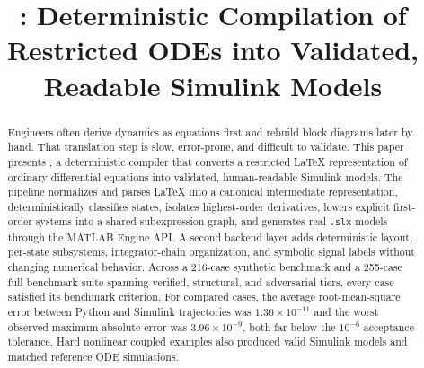 \documentclass[colorlinks,upint,subscriptcorrection,varvw,balance,nofoot]{asmeconf}
\newcommand{\EqnToSim}{\NoCaseChange{Eqn2Sim}}
\begin{document}

\title{\EqnToSim: Deterministic Compilation of Restricted \NoCaseChange{\LaTeX} ODEs into Validated, Readable Simulink Models}


\maketitle



\begin{abstract}
Engineers often derive dynamics as equations first and rebuild block diagrams later by hand. That translation step is slow, error-prone, and difficult to validate. This paper presents \EqnToSim, a deterministic compiler that converts a restricted \LaTeX{} representation of ordinary differential equations into validated, human-readable Simulink models. The pipeline normalizes and parses \LaTeX{} into a canonical intermediate representation, deterministically classifies states, isolates highest-order derivatives, lowers explicit first-order systems into a shared-subexpression graph, and generates real \texttt{.slx} models through the MATLAB Engine API. A second backend layer adds deterministic layout, per-state subsystems, integrator-chain organization, and symbolic signal labels without changing numerical behavior. Across a 216-case synthetic benchmark and a 255-case full benchmark suite spanning verified, structural, and adversarial tiers, every case satisfied its benchmark criterion. For compared cases, the average root-mean-square error between Python and Simulink trajectories was $1.36\times10^{-11}$ and the worst observed maximum absolute error was $3.96\times10^{-9}$, both far below the $10^{-6}$ acceptance tolerance. Hard nonlinear coupled examples also produced valid Simulink models and matched reference ODE simulations.
\end{abstract}

\begin{nomenclature}
\end{nomenclature}
\end{document}
